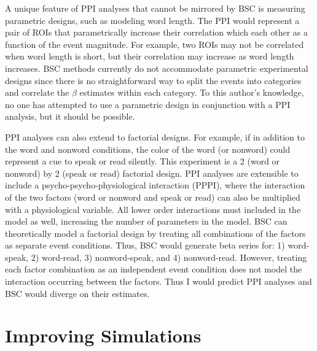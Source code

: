 \documentclass[phd,figures,tables,ackpage,abstractpage,publicabstractpage]{uithesis}
\begin{document}
A unique feature of PPI analyses that cannot be mirrored by BSC is
measuring parametric designs, such as modeling word length.
The PPI would represent a pair of ROIs that parametrically increase
their correlation which each other as a function of the event magnitude.
For example, two ROIs may not be correlated when word length is short,
but their correlation may increase as word length increases.
BSC methods currently do not accommodate parametric experimental designs
since there is no straightforward way to split the events into categories
and correlate the $\beta$ estimates within each category.
To this author's knowledge, no one has attempted to use a parametric design
in conjunction with a PPI analysis, but it should be possible.

PPI analyses can also extend to factorial designs.
For example, if in addition to the word and nonword conditions,
the color of the word (or nonword) could represent a cue to speak or read silently.
This experiment is a 2 (word or nonword) by 2 (speak or read) factorial design.
PPI analyses are extensible to include a psycho-psycho-physiological interaction (PPPI),
where the interaction of the two factors (word or nonword and speak or read) can also be
multiplied with a physiological variable.
All lower order interactions must included in the model as well, increasing the number
of parameters in the model.
BSC can theoretically model a factorial design by treating all combinations of the factors
as separate event conditions.
Thus, BSC would generate beta series for: 1) word-speak, 2) word-read, 3) nonword-speak,
and 4) nonword-read.
However, treating each factor combination as an independent event condition does not model the
interaction occurring between the factors.
Thus I would predict PPI analyses and BSC would diverge on their estimates.

\section{Improving Simulations}
\end{document}
